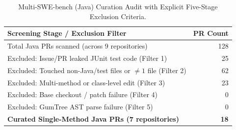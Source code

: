 \begin{table}[t]
\centering
\caption{Multi-SWE-bench (Java) Curation Audit with Explicit Five-Stage Exclusion Criteria.}
\label{tab:curation_multiswe}
\begin{tabular}{lr}
\toprule
Screening Stage / Exclusion Filter & PR Count \\
\midrule
Total Java PRs scanned (across 9 repositories) & 128 \\
Excluded: Issue/PR leaked JUnit test code (Filter 1) & 25 \\
Excluded: Touched non-Java/test files or $\neq 1$ file (Filter 2) & 62 \\
Excluded: Multi-method or class-level edit (Filter 3) & 23 \\
Excluded: Base checkout / patch failure (Filter 4) & 0 \\
Excluded: GumTree AST parse failure (Filter 5) & 0 \\
\midrule
\textbf{Curated Single-Method Java PRs (7 repositories)} & \textbf{18} \\
\bottomrule
\end{tabular}
\end{table}
